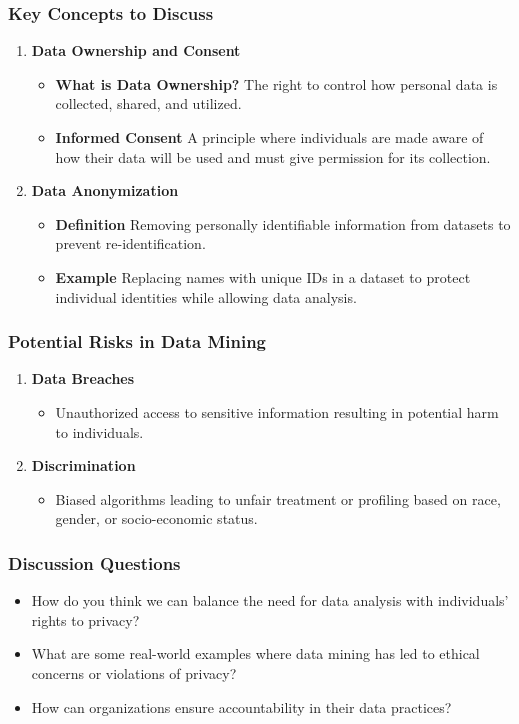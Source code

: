 \documentclass{beamer}
\begin{document}
\begin{frame}[fragile]
    \frametitle{Key Concepts to Discuss}
    \begin{enumerate}
        \item \textbf{Data Ownership and Consent}
            \begin{itemize}
                \item \textbf{What is Data Ownership?} The right to control how personal data is collected, shared, and utilized.
                \item \textbf{Informed Consent} A principle where individuals are made aware of how their data will be used and must give permission for its collection.
            \end{itemize}
        \item \textbf{Data Anonymization}
            \begin{itemize}
                \item \textbf{Definition} Removing personally identifiable information from datasets to prevent re-identification.
                \item \textbf{Example} Replacing names with unique IDs in a dataset to protect individual identities while allowing data analysis.
            \end{itemize}
    \end{enumerate}
\end{frame}

\begin{frame}[fragile]
    \frametitle{Potential Risks in Data Mining}
    \begin{enumerate}
        \item \textbf{Data Breaches}
            \begin{itemize}
                \item Unauthorized access to sensitive information resulting in potential harm to individuals.
            \end{itemize}
        \item \textbf{Discrimination}
            \begin{itemize}
                \item Biased algorithms leading to unfair treatment or profiling based on race, gender, or socio-economic status.
            \end{itemize}
    \end{enumerate}
\end{frame}

\begin{frame}[fragile]
    \frametitle{Discussion Questions}
    \begin{itemize}
        \item How do you think we can balance the need for data analysis with individuals’ rights to privacy?
        \item What are some real-world examples where data mining has led to ethical concerns or violations of privacy?
        \item How can organizations ensure accountability in their data practices?
    \end{itemize}
\end{frame}
\end{document}
